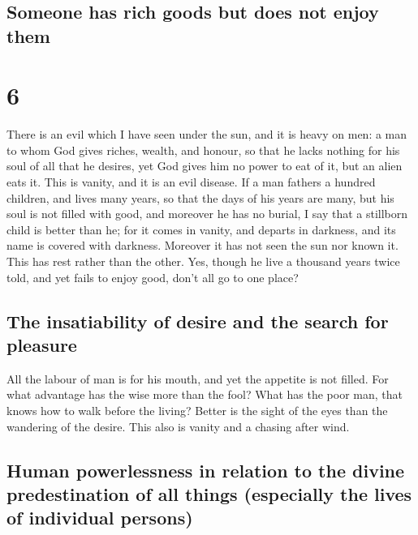 \hypertarget{someone-has-rich-goods-but-does-not-enjoy-them}{%
\subsection{Someone has rich goods but does not enjoy
them}\label{someone-has-rich-goods-but-does-not-enjoy-them}}

\hypertarget{section-5}{%
\section{6}\label{section-5}}

 There is an evil which I have seen under the sun, and it
is heavy on men:  a man to whom God gives riches, wealth,
and honour, so that he lacks nothing for his soul of all that he
desires, yet God gives him no power to eat of it, but an alien eats it.
This is vanity, and it is an evil disease.  If a man
fathers a hundred children, and lives many years, so that the days of
his years are many, but his soul is not filled with good, and moreover
he has no burial, I say that a stillborn child is better than he;
 for it comes in vanity, and departs in darkness, and its
name is covered with darkness.  Moreover it has not seen
the sun nor known it. This has rest rather than the other.
 Yes, though he live a thousand years twice told, and yet
fails to enjoy good, don't all go to one place?

\hypertarget{the-insatiability-of-desire-and-the-search-for-pleasure}{%
\subsection{The insatiability of desire and the search for
pleasure}\label{the-insatiability-of-desire-and-the-search-for-pleasure}}

 All the labour of man is for his mouth, and yet the
appetite is not filled.  For what advantage has the wise
more than the fool? What has the poor man, that knows how to walk before
the living?  Better is the sight of the eyes than the
wandering of the desire. This also is vanity and a chasing after wind.

\hypertarget{human-powerlessness-in-relation-to-the-divine-predestination-of-all-things-especially-the-lives-of-individual-persons}{%
\subsection{Human powerlessness in relation to the divine predestination
of all things (especially the lives of individual
persons)}\label{human-powerlessness-in-relation-to-the-divine-predestination-of-all-things-especially-the-lives-of-individual-persons}}

